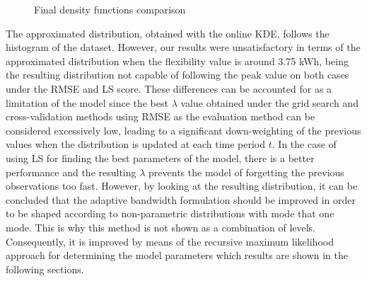 \begin{figure}[ht!]
\centering     %
{}
\caption{Final density functions comparison}
\label{fig:distribution_RMSE_LS}
\end{figure}

The approximated distribution, obtained with the online KDE, follows the histogram of the dataset. However, our results were unsatisfactory in terms of the approximated distribution when the flexibility value is around 3.75 kWh, being the resulting distribution not capable of following the peak value on both cases under the RMSE and LS score. These differences can be accounted for as a limitation of the model since the best $\lambda$ value obtained under the grid search and cross-validation methods using RMSE as the evaluation method can be considered excessively low, leading to a significant down-weighting of the previous values when the distribution is updated at each time period $t$. In the case of using LS for finding the best parameters of the model, there is a better performance and the resulting $\lambda$ prevents the model of forgetting the previous observations too fast. However, by looking at the resulting distribution, it can be concluded that the adaptive bandwidth formulation should be improved in order to be shaped according to non-parametric distributions with mode that one mode. This is why this method is not shown as a combination of levels. Consequently, it is improved by means of the recursive maximum likelihood approach for determining the model parameters which results are shown in the following sections.  




